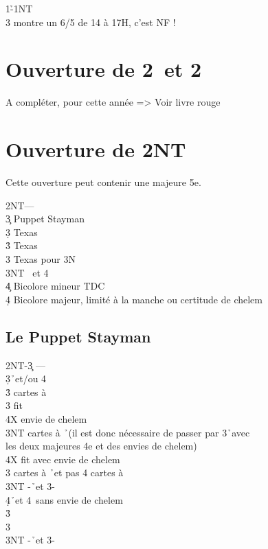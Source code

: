 \documentclass[a4paper]{article}
\begin{document}
\begin{bidtable}
1\h-1NT\\
3\s \> montre un 6/5 de 14 à 17H, c’est NF !
\end{bidtable}

\section{Ouverture de 2\pdfh\ et 2\pdfs}

A compléter, pour cette année => Voir livre rouge

\section{Ouverture de 2NT}

Cette ouverture peut contenir une majeure 5e.

\begin{bidtable}
2NT---\\
3\c \> Puppet Stayman\\
3\d \> Texas \h \\
3\h \> Texas \s \\
3\s \> Texas pour 3N\\
3NT \s\ et 4\h \\
4\c \> Bicolore mineur TDC\\
4\d \> Bicolore majeur, limité à la manche ou certitude de chelem
\end{bidtable}

\subsection{Le Puppet Stayman}

\begin{bidtable}
2NT-3\c \> ---\\
3\d {}\h\ et/ou 4\s \+\\
3\h {} cartes à \s \+\\
3\s \> fit \s \+\\
4X \> envie de chelem\-\\
3NT  cartes à \h\ (il est donc nécessaire de passer par 3\h\ avec\\
\>les deux majeures 4e et des envies de chelem)\\
\>4X fit avec envie de chelem\-\\
3\s {} cartes à \h\ et pas 4 cartes à \s \\
3NT -\h\ et 3-\s \\
4\d {}\h\ et 4\s\ sans envie de chelem\-\\
3\h {}\h \\
3\s {}\s \\
3NT -\h\ et 3-\s 
\end{bidtable}
\end{document}
